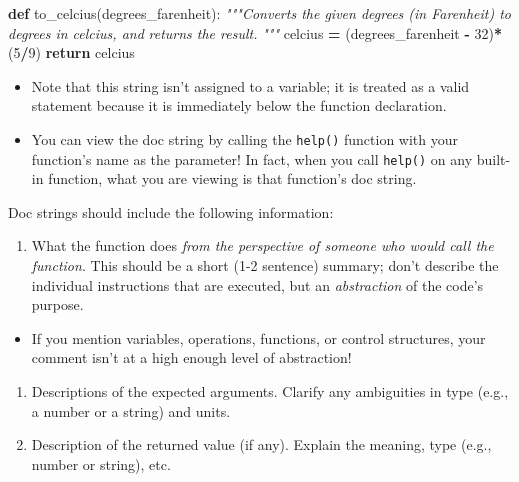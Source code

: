 \documentclass[]{book}
\newenvironment{Shaded}{\begin{snugshade}}{\end{snugshade}}
\newcommand{\KeywordTok}[1]{\textcolor[rgb]{0.13,0.29,0.53}{\textbf{#1}}}
\newcommand{\DecValTok}[1]{\textcolor[rgb]{0.00,0.00,0.81}{#1}}
\newcommand{\CommentTok}[1]{\textcolor[rgb]{0.56,0.35,0.01}{\textit{#1}}}
\newcommand{\ControlFlowTok}[1]{\textcolor[rgb]{0.13,0.29,0.53}{\textbf{#1}}}
\newcommand{\OperatorTok}[1]{\textcolor[rgb]{0.81,0.36,0.00}{\textbf{#1}}}
\newcommand{\NormalTok}[1]{#1}
\providecommand{\tightlist}{%
  \setlength{\itemsep}{0pt}\setlength{\parskip}{0pt}}
\begin{document}
\begin{Shaded}
\begin{Highlighting}[]
\KeywordTok{def}\NormalTok{ to_celcius(degrees_farenheit):}
    \CommentTok{"""Converts the given degrees (in Farenheit) to degrees in celcius, and}
\CommentTok{       returns the result.}
\CommentTok{    """}
\NormalTok{    celcius }\OperatorTok{=}\NormalTok{ (degrees_farenheit }\OperatorTok{-} \DecValTok{32}\NormalTok{)}\OperatorTok{*}\NormalTok{(}\DecValTok{5}\OperatorTok{/}\DecValTok{9}\NormalTok{)}
    \ControlFlowTok{return}\NormalTok{ celcius}
\end{Highlighting}
\end{Shaded}

\begin{itemize}
\item
  Note that this string isn't assigned to a variable; it is treated as a
  valid statement because it is immediately below the function
  declaration.
\item
  You can view the doc string by calling the \texttt{help()} function
  with your function's name as the parameter! In fact, when you call
  \texttt{help()} on any built-in function, what you are viewing is that
  function's doc string.
\end{itemize}

Doc strings should include the following information:

\begin{enumerate}
\def\labelenumi{\arabic{enumi}.}
\tightlist
\item
  What the function does \emph{from the perspective of someone who would
  call the function}. This should be a short (1-2 sentence) summary;
  don't describe the individual instructions that are executed, but an
  \emph{abstraction} of the code's purpose.
\end{enumerate}

\begin{itemize}
\tightlist
\item
  If you mention variables, operations, functions, or control
  structures, your comment isn't at a high enough level of abstraction!
\end{itemize}

\begin{enumerate}
\def\labelenumi{\arabic{enumi}.}
\setcounter{enumi}{1}
\item
  Descriptions of the expected arguments. Clarify any ambiguities in
  type (e.g., a number or a string) and units.
\item
  Description of the returned value (if any). Explain the meaning, type
  (e.g., number or string), etc.
\end{enumerate}
\end{document}
